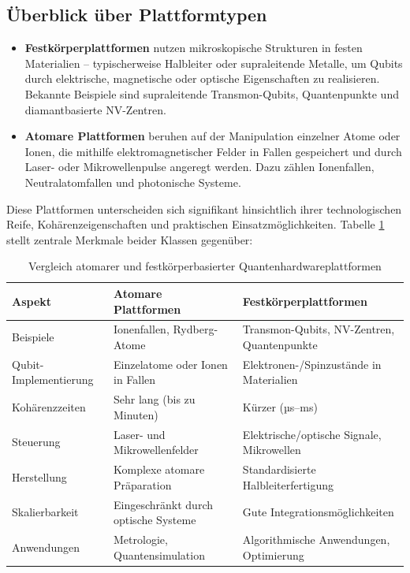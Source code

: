 \subsection{Überblick über Plattformtypen}
\begin{itemize}
\item \textbf{Festkörperplattformen} nutzen mikroskopische Strukturen in festen Materialien – typischerweise Halbleiter oder supraleitende Metalle, um Qubits durch elektrische, magnetische oder optische Eigenschaften zu realisieren. Bekannte Beispiele sind supraleitende Transmon-Qubits, Quantenpunkte und diamantbasierte NV-Zentren.
\item \textbf{Atomare Plattformen} beruhen auf der Manipulation einzelner Atome oder Ionen, die mithilfe elektromagnetischer Felder in Fallen gespeichert und durch Laser- oder Mikrowellenpulse angeregt werden. Dazu zählen Ionenfallen, Neutralatomfallen und photonische Systeme.
\end{itemize}

Diese Plattformen unterscheiden sich signifikant hinsichtlich ihrer technologischen Reife, Kohärenzeigenschaften und praktischen Einsatzmöglichkeiten. Tabelle \ref{tab:plattformvergleich} stellt zentrale Merkmale beider Klassen gegenüber:

\begin{table}[h]
\centering
\caption{Vergleich atomarer und festkörperbasierter Quantenhardwareplattformen}
\label{tab:plattformvergleich}
\begin{tabular}{|p{4cm}|p{5cm}|p{5cm}|}
\hline
\textbf{Aspekt} & \textbf{Atomare Plattformen} & \textbf{Festkörperplattformen} \\
\hline
Beispiele & Ionenfallen, Rydberg-Atome & Transmon-Qubits, NV-Zentren, Quantenpunkte \\
Qubit-Implementierung & Einzelatome oder Ionen in Fallen & Elektronen-/Spinzustände in Materialien \\
Kohärenzzeiten & Sehr lang (bis zu Minuten) & Kürzer (µs–ms) \\
Steuerung & Laser- und Mikrowellenfelder & Elektrische/optische Signale, Mikrowellen \\
Herstellung & Komplexe atomare Präparation & Standardisierte Halbleiterfertigung \\
Skalierbarkeit & Eingeschränkt durch optische Systeme & Gute Integrationsmöglichkeiten \\
Anwendungen & Metrologie, Quantensimulation & Algorithmische Anwendungen, Optimierung \\
\hline
\end{tabular}
\end{table}


